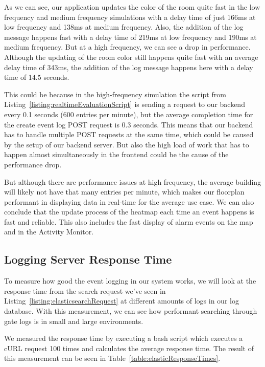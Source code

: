 As we can see, our application updates the color of the room quite fast in the low frequency and medium frequency simulations with a delay time of just 166ms at low frequency and 138ms at medium frequency.
Also, the addition of the log message happens fast with a delay time of 219ms at low frequency and 190ms at medium frequency.
But at a high frequency, we can see a drop in performance. Although the updating of the room color still happens quite fast with an average delay time of 343ms, the addition of the log message happens here with a delay time of 14.5 seconds. 

This could be because in the high-frequency simulation the script from Listing~\ref{listing:realtimeEvaluationScript} is sending a request to our backend every 0.1 seconds (600 entries per minute), but the average completion time for the create event log POST request is 0.3 seconds. This means that our backend has to handle multiple POST requests at the same time, which could be caused by the setup of our backend server. But also the high load of work that has to happen almost simultaneously in the frontend could be the cause of the performance drop. 

But although there are performance issues at high frequency, the average building will likely not have that many entries per minute, which makes our floorplan performant in displaying data in real-time for the average use case. We can also conclude that the update process of the heatmap each time an event happens is fast and reliable. This also includes the fast display of alarm events on the map and in the Activity Monitor.

\subsection{Logging Server Response Time}

To measure how good the event logging in our system works, we will look at the response time from the search request we've seen in Listing~\ref{listing:elasticsearchRequest}
at different amounts of logs in our log database. With this measurement, we can see how performant searching through gate logs is in small and large environments. 

We measured the response time by executing a bash script which executes a cURL request 100 times and calculates the average response time. 
The result of this measurement can be seen in Table~\ref{table:elasticResponseTimes}.
 
